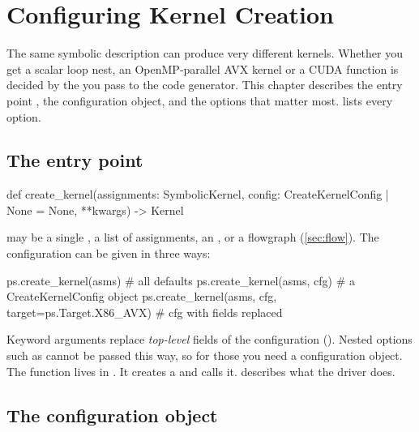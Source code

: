 \chapter{Configuring Kernel Creation}\label{ch:kernel-creation}

The same symbolic description can produce very different kernels. Whether you get a
scalar loop nest, an OpenMP-parallel AVX kernel or a CUDA function is decided by the
 you pass to the code generator. This chapter describes the entry
point , the configuration object, and the options that matter most.
 lists every option.

\section{The entry point}

\begin{pycode}
def create_kernel(assignments: SymbolicKernel,
                  config: CreateKernelConfig | None = None,
                  **kwargs) -> Kernel
\end{pycode}
 may be a single , a list of assignments, an
, or a flowgraph (\cref{sec:flow}). The configuration can be
given in three ways:
\begin{pycode}
ps.create_kernel(asms)                                   # all defaults
ps.create_kernel(asms, cfg)                              # a CreateKernelConfig object
ps.create_kernel(asms, cfg, target=ps.Target.X86_AVX)   # cfg with fields replaced
\end{pycode}
Keyword arguments replace \emph{top-level} fields of the configuration
(). Nested options such as  cannot be
passed this way, so for those you need a configuration object. The function lives in
. It creates a
 and calls it.  describes what
the driver does.

\section{The configuration object}\label{sec:config}

